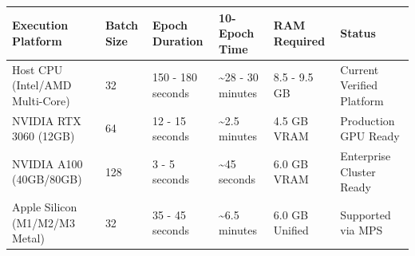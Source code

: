 \begin{tabular}{llllll}
\toprule
Execution Platform & Batch Size & Epoch Duration & 10-Epoch Time & RAM Required & Status \\
\midrule
Host CPU (Intel/AMD Multi-Core) & 32 & 150 - 180 seconds & \textasciitilde 28 - 30 minutes & 8.5 - 9.5 GB & Current Verified Platform \\
NVIDIA RTX 3060 (12GB) & 64 & 12 - 15 seconds & \textasciitilde 2.5 minutes & 4.5 GB VRAM & Production GPU Ready \\
NVIDIA A100 (40GB/80GB) & 128 & 3 - 5 seconds & \textasciitilde 45 seconds & 6.0 GB VRAM & Enterprise Cluster Ready \\
Apple Silicon (M1/M2/M3 Metal) & 32 & 35 - 45 seconds & \textasciitilde 6.5 minutes & 6.0 GB Unified & Supported via MPS \\
\bottomrule
\end{tabular}
